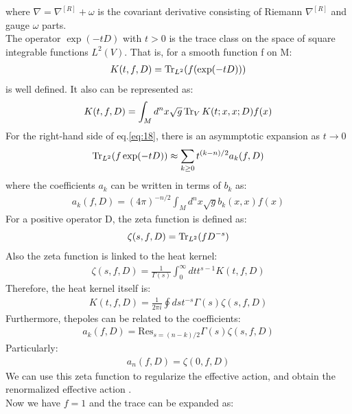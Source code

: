 where $\nabla = \nabla ^{[R]} + \omega$ is the covariant derivative consisting of Riemann $\nabla ^{[R]}$ and gauge $\omega$ parts. \\
\indent The operator $\exp (-tD)$ with $t>0$ is the trace class on the space of square integrable functions $L^{2} (V)$. That is, for a smooth function f on M:
\begin{align}
    \label{eq:18}
    K(t,f,D) = \Tr _{L^{2}} (f(\exp (-tD)))
\end{align} 
is well defined. It also can be represented as:
\begin{align}
    K(t,f,D) = \int _{M} d^{n}x \sqrt{g} \Tr _{V} K(t;x,x;D) f(x)
\end{align}
For the right-hand side of eq.\ref{eq:18}, there is an asymmptotic expansion \parencite{greiner_asymptotic_1971} as $t \rightarrow 0$
\begin{align}
    \Tr _{L^{2}} (f \exp(-tD)) \approx \sum _{k\geq 0} t^{(k-n)/2} a_{k}(f,D)
\end{align}
where the coefficients $a_{k}$ can be written in terms of $b_{k}$ as:
\begin{align}
    a_{k}(f,D) = (4\pi)^{-n/2} \int _{M} d^{n} x \sqrt{g} b_{k}(x,x) f(x)
\end{align}
For a positive operator D, the zeta function is defined as:
\begin{align}
    \zeta (s,f,D) = \Tr _{L^{2}} (fD^{-s})
\end{align}
Also the zeta function is linked to the heat kernel:
\begin{align}
    \zeta (s,f,D) = \frac{1}{\Gamma (s)} \int _{0}^{\infty} dt t^{s-1} K(t,f,D)
\end{align}
Therefore, the heat kernel itself is:
\begin{align}
    K(t,f,D) = \frac{1}{2\pi i} \oint ds t^{-s} \Gamma (s) \zeta (s,f,D)
\end{align}
Furthermore, thepoles can be related to the coefficients:
\begin{align}
    a_{k}(f,D) = \text{Res} _{s= (n-k)/2} \Gamma(s) \zeta(s,f,D)
\end{align}
Particularly:
\begin{align}
    \label{eq:27}
    a_{n}(f,D) = \zeta(0,f,D)
\end{align}
We can use this zeta function to regularize the effective action, and obtain the renormalized effective action \parencite{vassilevich_heat_2003,hawking_zeta_1977}. \\
\indent Now we have $f=1$ and the trace can be expanded as:

